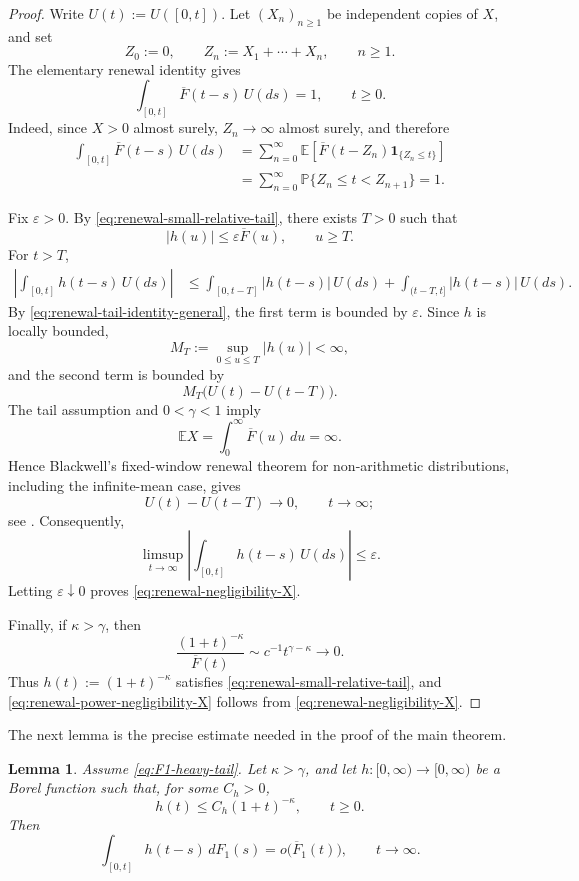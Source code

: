 \documentclass[reqno,final,11pt]{amsart}
\newcommand{\E}{\mathbb E}
\newcommand{\Pbb}{\mathbb P}
\newcommand{\ind}[1]{\mathbf 1_{\{#1\}}}
\theoremstyle{plain}
\newtheorem{lemma}[theorem]{Lemma}
\theoremstyle{definition}
\theoremstyle{remark}
\numberwithin{equation}{section}
\begin{document}
\begin{proof}
Write \(U(t):=U([0,t])\). Let \((X_n)_{n\ge1}\) be independent copies of \(X\), and set
\[
  Z_0:=0,
  \qquad
  Z_n:=X_1+\cdots+X_n,
  \qquad n\ge1.
\]
The elementary renewal identity gives
\begin{equation}\label{eq:renewal-tail-identity-general}
  \int_{[0,t]}\overline F(t-s)\,U(ds)=1,
  \qquad t\ge0.
\end{equation}
Indeed, since \(X>0\) almost surely, \(Z_n\to\infty\) almost surely, and therefore
\[
\begin{split}
  \int_{[0,t]}\overline F(t-s)\,U(ds)
  &=\sum_{n=0}^{\infty}
  \E\left[\overline F(t-Z_n)\ind{Z_n\le t}\right]\\
  &=\sum_{n=0}^{\infty}\Pbb\{Z_n\le t<Z_{n+1}\}
  =1.
\end{split}
\]

Fix \(\varepsilon>0\). By \eqref{eq:renewal-small-relative-tail}, there exists \(T>0\) such that
\[
  |h(u)|\le\varepsilon\overline F(u),
  \qquad u\ge T.
\]
For \(t>T\),
\[
\begin{split}
  \left|\int_{[0,t]}h(t-s)\,U(ds)\right|
  &\le
  \int_{[0,t-T]}|h(t-s)|\,U(ds)
  +\int_{(t-T,t]}|h(t-s)|\,U(ds).
\end{split}
\]
By \eqref{eq:renewal-tail-identity-general}, the first term is bounded by \(\varepsilon\). Since \(h\) is locally bounded,
\[
  M_T:=\sup_{0\le u\le T}|h(u)|<\infty,
\]
and the second term is bounded by
\[
  M_T\bigl(U(t)-U(t-T)\bigr).
\]
The tail assumption and \(0<\gamma<1\) imply
\[
  \E X=\int_0^\infty\overline F(u)\,du=\infty.
\]
Hence Blackwell's fixed-window renewal theorem for non-arithmetic distributions, including the infinite-mean case, gives
\[
  U(t)-U(t-T)\longrightarrow0,
  \qquad t\to\infty;
\]
see \cite[Eq.~(1.1), p.~88]{Thorisson1987}. Consequently,
\[
  \limsup_{t\to\infty}
  \left|\int_{[0,t]}h(t-s)\,U(ds)\right|
  \le\varepsilon.
\]
Letting \(\varepsilon\downarrow0\) proves \eqref{eq:renewal-negligibility-X}.

Finally, if \(\kappa>\gamma\), then
\[
  \frac{(1+t)^{-\kappa}}{\overline F(t)}
  \sim c^{-1}t^{\gamma-\kappa}
  \longrightarrow0.
\]
Thus \(h(t):=(1+t)^{-\kappa}\) satisfies \eqref{eq:renewal-small-relative-tail}, and \eqref{eq:renewal-power-negligibility-X} follows from \eqref{eq:renewal-negligibility-X}.
\end{proof}

The next lemma is the precise estimate needed in the proof of the main theorem.

\begin{lemma}\label{lem:F1-stieltjes}
Assume \eqref{eq:F1-heavy-tail}. Let \(\kappa>\gamma\), and let \(h:[0,\infty)\to[0,\infty)\) be a Borel function such that, for some \(C_h>0\),
\begin{equation}\label{eq:h-kappa-bound}
  h(t)\le C_h(1+t)^{-\kappa},
  \qquad t\ge0.
\end{equation}
Then
\begin{equation}\label{eq:F1-conv-estimate}
  \int_{[0,t]}h(t-s)\,dF_1(s)
  =o\bigl(\overline F_1(t)\bigr),
  \qquad t\to\infty.
\end{equation}
\end{lemma}
\end{document}
